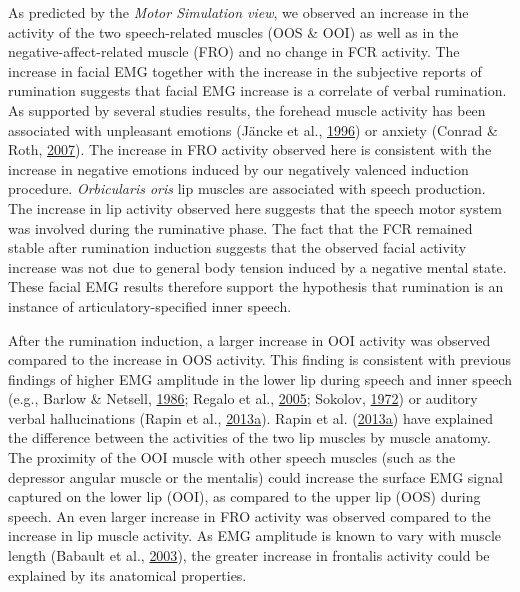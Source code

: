 \documentclass[a4paper,12pt,twoside,openright,oldfontcommands,final]{memoir}
\begin{document}
As predicted by the \emph{Motor Simulation view}, we observed an increase in the activity of the two speech-related muscles (OOS \& OOI) as well as in the negative-affect-related muscle (FRO) and no change in FCR activity. The increase in facial EMG together with the increase in the subjective reports of rumination suggests that facial EMG increase is a correlate of verbal rumination. As supported by several studies results, the forehead muscle activity has been associated with unpleasant emotions (Jäncke et al., \protect\hyperlink{ref-Jancke1996}{1996}) or anxiety (Conrad \& Roth, \protect\hyperlink{ref-conrad_muscle_2007}{2007}). The increase in FRO activity observed here is consistent with the increase in negative emotions induced by our negatively valenced induction procedure. \emph{Orbicularis oris} lip muscles are associated with speech production. The increase in lip activity observed here suggests that the speech motor system was involved during the ruminative phase. The fact that the FCR remained stable after rumination induction suggests that the observed facial activity increase was not due to general body tension induced by a negative mental state. These facial EMG results therefore support the hypothesis that rumination is an instance of articulatory-specified inner speech.

After the rumination induction, a larger increase in OOI activity was observed compared to the increase in OOS activity. This finding is consistent with previous findings of higher EMG amplitude in the lower lip during speech and inner speech (e.g., Barlow \& Netsell, \protect\hyperlink{ref-barlow_differential_1986}{1986}; Regalo et al., \protect\hyperlink{ref-regalo_electromyographic_2005}{2005}; Sokolov, \protect\hyperlink{ref-sokolov_inner_1972}{1972}) or auditory verbal hallucinations (Rapin et al., \protect\hyperlink{ref-rapin_emg_2013}{2013}\protect\hyperlink{ref-rapin_emg_2013}{a}). Rapin et al. (\protect\hyperlink{ref-rapin_emg_2013}{2013}\protect\hyperlink{ref-rapin_emg_2013}{a}) have explained the difference between the activities of the two lip muscles by muscle anatomy. The proximity of the OOI muscle with other speech muscles (such as the depressor angular muscle or the mentalis) could increase the surface EMG signal captured on the lower lip (OOI), as compared to the upper lip (OOS) during speech. An even larger increase in FRO activity was observed compared to the increase in lip muscle activity. As EMG amplitude is known to vary with muscle length (Babault et al., \protect\hyperlink{ref-babault_effect_2003}{2003}), the greater increase in frontalis activity could be explained by its anatomical properties.
\end{document}
